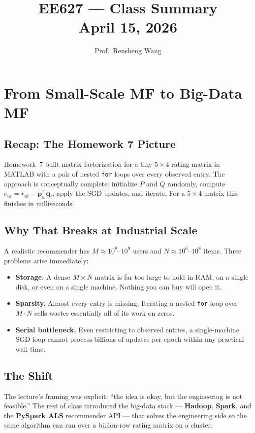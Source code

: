 \documentclass[11pt]{article}
\title{\textbf{EE627 --- Class Summary}\\[0.4em]
       \large April 15, 2026}
\author{Prof.\ Rensheng Wang}
\date{}
\begin{document}
\maketitle
\tableofcontents
\newpage

\section{From Small-Scale MF to Big-Data MF}

\subsection{Recap: The Homework 7 Picture}
Homework~7 built matrix factorization for a tiny $5 \times 4$ rating matrix in MATLAB with a pair of nested \texttt{for} loops over every observed entry. The approach is conceptually complete: initialize $P$ and $Q$ randomly, compute $e_{ui} = r_{ui} - \mathbf{p}_u^{\top}\mathbf{q}_i$, apply the SGD updates, and iterate. For a $5 \times 4$ matrix this finishes in milliseconds.

\subsection{Why That Breaks at Industrial Scale}
A realistic recommender has $M \approx 10^{8}$--$10^{9}$ users and $N \approx 10^{6}$--$10^{8}$ items. Three problems arise immediately:

\begin{itemize}
    \item \textbf{Storage.} A dense $M \times N$ matrix is far too large to hold in RAM, on a single disk, or even on a single machine. Nothing you can buy will open it.
    \item \textbf{Sparsity.} Almost every entry is missing. Iterating a nested \texttt{for} loop over $M \cdot N$ cells wastes essentially all of its work on zeros.
    \item \textbf{Serial bottleneck.} Even restricting to observed entries, a single-machine SGD loop cannot process billions of updates per epoch within any practical wall time.
\end{itemize}

\subsection{The Shift}
The lecture's framing was explicit: ``the idea is okay, but the engineering is not feasible.'' The rest of class introduced the big-data stack --- \textbf{Hadoop}, \textbf{Spark}, and the \textbf{PySpark ALS} recommender API --- that solves the engineering side so the same algorithm can run over a billion-row rating matrix on a cluster.
\end{document}
